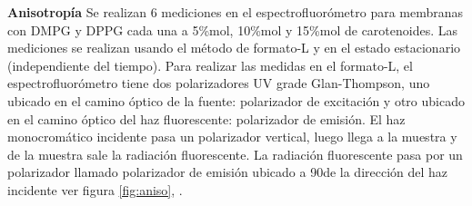 \documentclass[12pt]{article}
\begin{document}
\begin{itemize}
\textbf{Anisotropía} Se realizan 6 mediciones en el espectrofluorómetro para membranas con DMPG y DPPG cada una a 5\%mol, 10\%mol y 15\%mol de carotenoides. Las mediciones se realizan usando el método de formato-L y en el estado estacionario (independiente del tiempo). Para realizar las medidas en el formato-L, el espectrofluorómetro tiene dos polarizadores UV grade Glan-Thompson, uno ubicado en el camino óptico de la fuente: polarizador de excitación y otro ubicado en el camino óptico del haz fluorescente: polarizador de emisión. El haz monocromático incidente pasa un polarizador vertical, luego llega a la muestra y de la muestra sale la radiación fluorescente. La radiación fluorescente pasa por un polarizador llamado polarizador de emisión ubicado a 90\textdegree de la dirección del haz incidente ver figura \ref{fig:aniso}, \cite{Lakowicz2006}.\\


\end{itemize}
\end{document}
